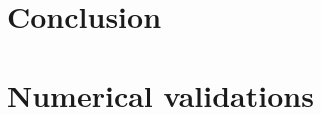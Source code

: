 \documentclass{My_preprint}
\begin{document}
% 

\section{Conclusion}


\appendix
\section{Numerical validations}
\label{ap:validation}

% 




\end{document}
